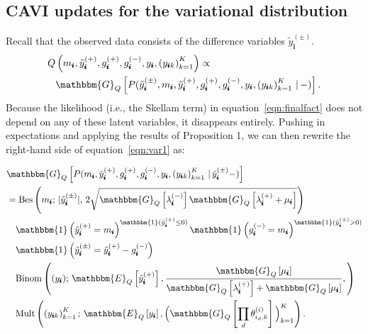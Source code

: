 \documentclass[letterpaper]{article}
\newcommand{\subs}{\pmb{i}}
\newcommand{\wsup}[2]{#1_{\subs}^{(#2)}}
\newcommand{\ytP}{\wsup{\tilde{y}}{+}}
\newcommand{\ytPM}{\wsup{\tilde{y}}{\pm}}
\newcommand{\ysk}{y_{\subs k}}
\newcommand{\ys}{y_{\subs}}
\newcommand{\lamP}{\wsup{\lambda}{+}}
\newcommand{\lamM}{\wsup{\lambda}{-}}
\newcommand{\gP}{\wsup{g}{+}}
\newcommand{\gM}{\wsup{g}{-}}
\newcommand{\ms}{m_{\subs}}
\newcommand{\Eq}[1]{\mathbbm{E}_Q\left[#1\right]}
\newcommand{\Gq}[1]{\mathbbm{G}_Q\left[#1\right]}
\begin{document}
  \subsection{CAVI updates for the variational distribution}
  \label{sec:cavi}
  Recall that the observed data consists of the difference variables $\ytPM$.
  \begin{align}
    \label{eqn:var1}
  Q& \left( \ms, \ytP, \gP, \gM, \ys, \left(\ysk\right)_{k=1}^K\right) \propto \notag\\
  & \Gq{P(\ytPM, \ms, \ytP, \gP, \gM, \ys, \left(\ysk\right)_{k=1}^K \,|\,-)}.
  \end{align}
  Because the likelihood (i.e., the Skellam term) in
  equation~\ref{eqn:finalfact} does not depend on any of these latent variables,
  it disappears entirely. Pushing in expectations and applying the results of Proposition
  1, we can then rewrite the right-hand side of
  equation~\ref{eqn:var1} as:
    
    \begin{align}
  &\Gq{P(\ms, \ytP, \gP, \gM, \ys, \left(\ysk\right)_{k=1}^K \,|\,\ytPM-)}\notag\\
  &= \text{Bes}\left(\ms;\, | \ytPM|,\,2\sqrt{\Gq{\lamM}\Gq{\lamP +\mu_{\subs}}}\right)\notag\\
  &\quad \mathbbm{1} \left(\ytP=\ms\right)^{\mathbbm{1}(\ytPM \leq 0)} 
   \mathbbm{1} \left(\gM=\ms\right)^{\mathbbm{1}(\ytPM > 0)} \notag \\
  &\quad \mathbbm{1}\left(\ytPM = \ytP - \gM\right)\notag\\
  &\quad \text{Binom}\left((\ys);\,
      \Eq{\ytP}, \frac{\Gq{\mu_{\subs}}}{\Gq{\lamP} + \Gq{\mu_{\subs}}},
      \right)\notag\\
  &\quad \text{Mult}\left(\left(\ysk\right)_{k=1}^K;\, \Eq{\ys}, \Big(\Gq{ \prod_d \theta_{i_d,k}^{(i)} }\Big)_{k=1}^K\right).
  \end{align}
  
\end{document}
